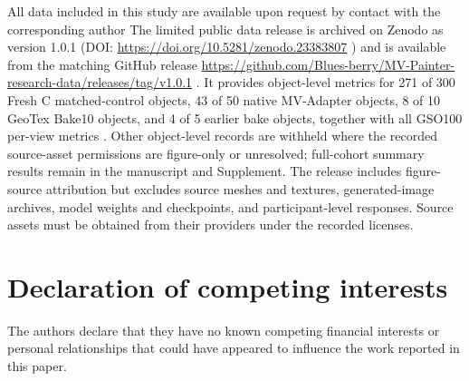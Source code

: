 \documentclass[times,twocolumn,final]{elsarticle}
\providecommand{\DIFadd}[1]{{\protect\color{blue} \sf #1}} %
\providecommand{\DIFdel}[1]{{\protect\color{red} \scriptsize #1}} %
\providecommand{\DIFaddbegin}{} %
\providecommand{\DIFaddend}{} %
\providecommand{\DIFdelbegin}{} %
\providecommand{\DIFdelend}{} %
\begin{document}
\DIFdelbegin \DIFdel{All data included in this study are available upon request by contact with the corresponding author}\DIFdelend \DIFaddbegin \DIFadd{The limited public data release is archived on Zenodo as version 1.0.1 (DOI: }\url{https://doi.org/10.5281/zenodo.23383807}\DIFadd{) and is available from the matching GitHub release }\url{https://github.com/Blues-berry/MV-Painter-research-data/releases/tag/v1.0.1}\DIFadd{. It provides object-level metrics for 271 of 300 Fresh C matched-control objects, 43 of 50 native MV-Adapter objects, 8 of 10 GeoTex Bake10 objects, and 4 of 5 earlier bake objects, together with all GSO100 per-view metrics \cite{mvpainterlimiteddata2026}. Other object-level records are withheld where the recorded source-asset permissions are figure-only or unresolved; full-cohort summary results remain in the manuscript and Supplement. The release includes figure-source attribution but excludes source meshes and textures, generated-image archives, model weights and checkpoints, and participant-level responses. Source assets must be obtained from their providers under the recorded licenses}\DIFaddend .

\section*{Declaration of competing interests}

The authors declare that they have no known competing financial interests or personal relationships that could have appeared to influence the work reported in this paper.
\end{document}
